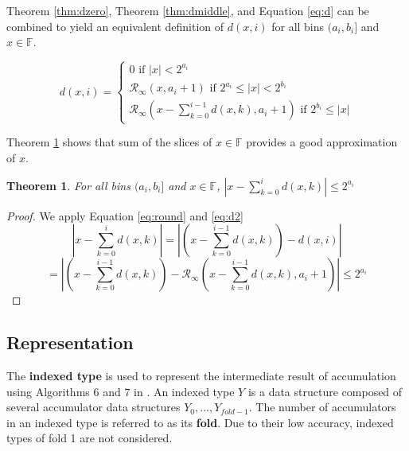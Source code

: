\documentclass[12pt]{article}
\providecommand{\F}{\ensuremath{\mathbb{F}}}
\providecommand{\roundtonearestinfty}{\ensuremath{\mathcal{R}_\text{$\infty$}}}
\theoremstyle{plain}
\newtheorem{thm}{Theorem}[section]
\numberwithin{equation}{section}
\begin{document}
    Theorem \ref{thm:dzero}, Theorem \ref{thm:dmiddle}, and Equation \ref{eq:d} can be combined to yield an equivalent definition of $d(x, i)$ for all bins $(a_i, b_i]$ and $x \in \F$.

    \begin{equation}
      d(x, i) = \begin{cases}0 \text{ if } |x| < 2^{a_i}\\ \roundtonearestinfty(x, a_i + 1) \text{ if } 2^{a_i} \leq |x| < 2^{b_i}\\\roundtonearestinfty(x - \sum\limits_{k=0}^{i - 1}d(x,k), a_i + 1) \text{ if } 2^{b_i} \leq |x| \end{cases}
      \label{eq:d2}
    \end{equation}

    Theorem \ref{thm:dround} shows that sum of the slices of $x \in \F$ provides a good approximation of $x$.

    \begin{thm}
      For all bins $(a_i, b_i]$ and $x \in \F$, $|x - \sum \limits_{k = 0}^id(x, k)| \leq 2^{a_i}$
      \label{thm:dround}
    \end{thm}

    \begin{proof}
      We apply Equation \ref{eq:round} and \ref{eq:d2}
      \begin{equation*}
        |x - \sum \limits_{k = 0}^{i}d(x, k)| = |(x - \sum \limits_{k = 0}^{i - 1}d(x, k)) - d(x, i)|
      \end{equation*}
      \begin{equation*}
         = |(x - \sum \limits_{k = 0}^{i - 1}d(x, k)) - \roundtonearestinfty(x - \sum \limits_{k = 0}^{i - 1}d(x, k), a_{i} + 1)| \leq 2^{a_{i}}
      \end{equation*}
    \end{proof}

  \subsection{Representation}
    \label{sec:indexed_representation}
    The \textbf{indexed type} is used to represent the intermediate result of accumulation using Algorithms 6 and $7$ in \cite{repsum}.
    An indexed type $Y$ is a data structure composed of several accumulator data structures $Y_0, ..., Y_{fold - 1}$. The number of accumulators in an indexed type is referred to as its \textbf{fold}. Due to their low accuracy, indexed types of fold 1 are not considered.
\end{document}
